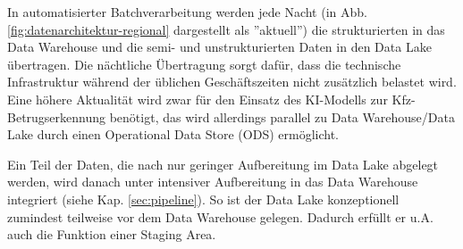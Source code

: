 In automatisierter Batchverarbeitung werden jede Nacht 
(in Abb. \ref{fig:datenarchitektur-regional} dargestellt als ''aktuell'')
die strukturierten in das Data Warehouse und die 
semi- und unstrukturierten Daten in den Data Lake übertragen.
Die nächtliche Übertragung sorgt dafür, dass die technische Infrastruktur
während der üblichen Geschäftszeiten nicht zusätzlich belastet wird.
Eine höhere Aktualität wird zwar für den Einsatz
des KI-Modells zur Kfz-Betrugserkennung benötigt,
das wird allerdings parallel zu Data Warehouse/Data Lake durch 
einen Operational Data Store (ODS) ermöglicht.

Ein Teil der Daten, die nach nur geringer Aufbereitung im Data Lake abgelegt werden,
wird danach unter intensiver Aufbereitung 
in das Data Warehouse integriert (siehe Kap. \ref{sec:pipeline}).
So ist der Data Lake konzeptionell zumindest teilweise vor
dem Data Warehouse gelegen. 
Dadurch erfüllt er u.A. auch die Funktion einer Staging Area.
